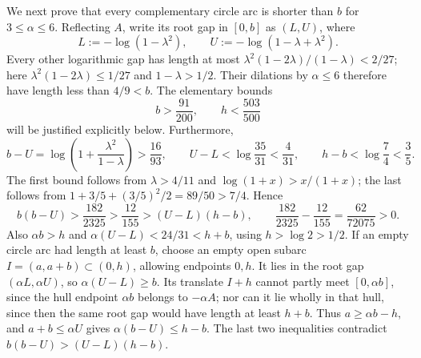 We next prove that every complementary circle arc is shorter than $b$ for
$3\le\alpha\le6$. Reflecting $A$, write its root gap in $[0,b]$ as $(L,U)$,
where
\[
 L:=-\log(1-\lambda^2),\qquad U:=-\log(1-\lambda+\lambda^2).
\]
Every other logarithmic gap has length at most
$\lambda^2(1-2\lambda)/(1-\lambda)<2/27$;
here $\lambda^2(1-2\lambda)\le1/27$ and $1-\lambda>1/2$.
Their dilations by $\alpha\le6$ therefore have length less than $4/9<b$.
The elementary bounds
\begin{equation}\label{eq:coarse-basic-bounds}
 b>\frac{91}{200},\qquad h<\frac{503}{500}
\end{equation}
will be justified explicitly below. Furthermore,
\[
 b-U=\log\left(1+\frac{\lambda^2}{1-\lambda}\right)>
 \frac{16}{93},\qquad
 U-L<\log\frac{35}{31}<\frac4{31},\qquad
 h-b<\log\frac74<\frac35.
\]
The first bound follows from $\lambda>4/11$ and
$\log(1+x)>x/(1+x)$; the last follows from
$1+3/5+(3/5)^2/2=89/50>7/4$. Hence
\[
 b(b-U)>\frac{182}{2325}>\frac{12}{155}>(U-L)(h-b),
 \qquad \frac{182}{2325}-\frac{12}{155}=\frac{62}{72075}>0.
\]
Also $\alpha b>h$ and $\alpha(U-L)<24/31<h+b$, using
$h>\log2>1/2$.
If an empty circle arc had length at least $b$, choose an empty open subarc
$I=(a,a+b)\subset(0,h)$, allowing endpoints $0,h$.
It lies in the root gap $(\alpha L,\alpha U)$, so $\alpha(U-L)\ge b$.
Its translate $I+h$ cannot partly meet $[0,\alpha b]$, since the hull endpoint
$\alpha b$ belongs to $-\alpha A$; nor can it lie wholly in that hull,
since then the same root gap would have length at least $h+b$.
Thus $a\ge\alpha b-h$, and $a+b\le\alpha U$ gives
$\alpha(b-U)\le h-b$. The last two inequalities contradict
$b(b-U)>(U-L)(h-b)$.

